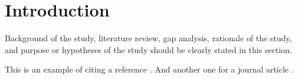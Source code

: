 \section{Introduction}
Background of the study, literature review, gap analysis, rationale of the study, and purpose or hypotheses of the study should be clearly stated in this section.

This is an example of citing a reference \parencite{sugiyono2011}. And another one for a journal article \parencite{risdianto2025}.
